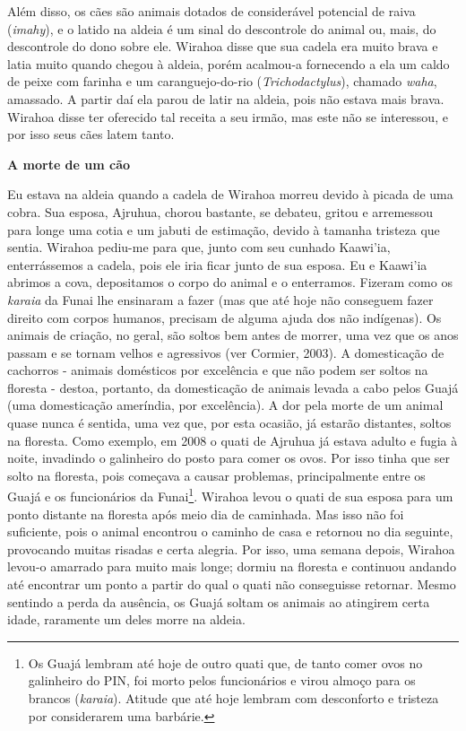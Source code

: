 Além disso, os cães são animais dotados de considerável potencial de
raiva (\emph{imahy}), e o latido na aldeia é um sinal do descontrole do
animal ou, mais, do descontrole do dono sobre ele. Wirahoa disse que sua
cadela era muito brava e latia muito quando chegou à aldeia, porém
acalmou-a fornecendo a ela um caldo de peixe com farinha e um
caranguejo-do-rio (\emph{Trichodactylus}), chamado \emph{waha},
amassado. A partir daí ela parou de latir na aldeia, pois não estava
mais brava. Wirahoa disse ter oferecido tal receita a seu irmão, mas
este não se interessou, e por isso seus cães latem tanto.

\textbf{A morte de um cão}

Eu estava na aldeia quando a cadela de Wirahoa morreu devido à picada de
uma cobra. Sua esposa, Ajruhua, chorou bastante, se debateu, gritou e
arremessou para longe uma cotia e um jabuti de estimação, devido à
tamanha tristeza que sentia. Wirahoa pediu-me para que, junto com seu
cunhado Kaawi'ia, enterrássemos a cadela, pois ele iria ficar junto de
sua esposa. Eu e Kaawi'ia abrimos a cova, depositamos o corpo do animal
e o enterramos. Fizeram como os \emph{karaia} da Funai lhe ensinaram a
fazer (mas que até hoje não conseguem fazer direito com corpos humanos,
precisam de alguma ajuda dos não indígenas). Os animais de criação, no
geral, são soltos bem antes de morrer, uma vez que os anos passam e se
tornam velhos e agressivos (ver Cormier, 2003). A domesticação de
cachorros - animais domésticos por excelência e que não podem ser soltos
na floresta - destoa, portanto, da domesticação de animais levada a cabo
pelos Guajá (uma domesticação ameríndia, por excelência). A dor pela
morte de um animal quase nunca é sentida, uma vez que, por esta ocasião,
já estarão distantes, soltos na floresta. Como exemplo, em 2008 o quati
de Ajruhua já estava adulto e fugia à noite, invadindo o galinheiro do
posto para comer os ovos. Por isso tinha que ser solto na floresta, pois
começava a causar problemas, principalmente entre os Guajá e os
funcionários da Funai\footnote{Os Guajá lembram até hoje de outro quati
  que, de tanto comer ovos no galinheiro do PIN, foi morto pelos
  funcionários e virou almoço para os brancos (\emph{karaia}). Atitude
  que até hoje lembram com desconforto e tristeza por considerarem uma
  barbárie.}. Wirahoa levou o quati de sua esposa para um ponto distante
na floresta após meio dia de caminhada. Mas isso não foi suficiente,
pois o animal encontrou o caminho de casa e retornou no dia seguinte,
provocando muitas risadas e certa alegria. Por isso, uma semana depois,
Wirahoa levou-o amarrado para muito mais longe; dormiu na floresta e
continuou andando até encontrar um ponto a partir do qual o quati não
conseguisse retornar. Mesmo sentindo a perda da ausência, os Guajá
soltam os animais ao atingirem certa idade, raramente um deles morre na
aldeia.

